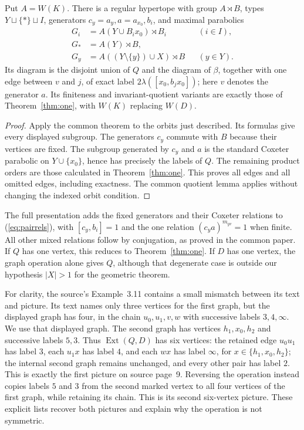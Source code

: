 \begin{theorem}\label{thm:fixed}
Put $A=W(K)$. There is a regular hypertope with group $A\rtimes B$, types $Y\sqcup\{*\}\sqcup I$, generators $c_y=a_y,a=a_{x_0},b_i$, and maximal parabolics
\begin{align*}
G_i&=A(Y\cup B_ix_0)\rtimes B_i&& (i\in I),\\
G_*&=A(Y)\rtimes B,\\
G_y&=A((Y\setminus\{y\})\cup X)\rtimes B&& (y\in Y).
\end{align*}
Its diagram is the disjoint union of $Q$ and the diagram of $\beta$, together with one edge between $v$ and $j$, of exact label $2\lambda([x_0,b_jx_0])$; here $v$ denotes the generator $a$. Its finiteness and invariant-quotient variants are exactly those of Theorem~\ref{thm:one}, with $W(K)$ replacing $W(D)$.
\end{theorem}
\begin{proof}
Apply the common theorem to the orbits just described. Its formulas give every displayed subgroup. The generators $c_y$ commute with $B$ because their vertices are fixed. The subgroup generated by $c_y$ and $a$ is the standard Coxeter parabolic on $Y\cup\{x_0\}$, hence has precisely the labels of $Q$. The remaining product orders are those calculated in Theorem~\ref{thm:one}. This proves all edges and all omitted edges, including exactness. The common quotient lemma applies without changing the indexed orbit condition.
\end{proof}

The full presentation adds the fixed generators and their Coxeter relations to (\ref{eq:pairrels}), with $[c_y,b_i]=1$ and the one relation $(c_ya)^{m_{yv}}=1$ when finite. All other mixed relations follow by conjugation, as proved in the common paper. If $Q$ has one vertex, this reduces to Theorem~\ref{thm:one}. If $D$ has one vertex, the graph operation alone gives $Q$, although that degenerate case is outside our hypothesis $|X|>1$ for the geometric theorem.

For clarity, the source's Example~3.11 contains a small mismatch between its text and picture. Its text names only three vertices for the first graph, but the displayed graph has four, in the chain $u_0,u_1,v,w$ with successive labels $3,4,\infty$. We use that displayed graph. The second graph has vertices $h_1,x_0,h_2$ and successive labels $5,3$. Thus $\operatorname{Ext}(Q,D)$ has six vertices: the retained edge $u_0u_1$ has label $3$, each $u_1x$ has label $4$, and each $wx$ has label $\infty$, for $x\in\{h_1,x_0,h_2\}$; the internal second graph remains unchanged, and every other pair has label $2$. This is exactly the first picture on source page~9. Reversing the operation instead copies labels $5$ and $3$ from the second marked vertex to all four vertices of the first graph, while retaining its chain. This is its second six-vertex picture. These explicit lists recover both pictures and explain why the operation is not symmetric.
